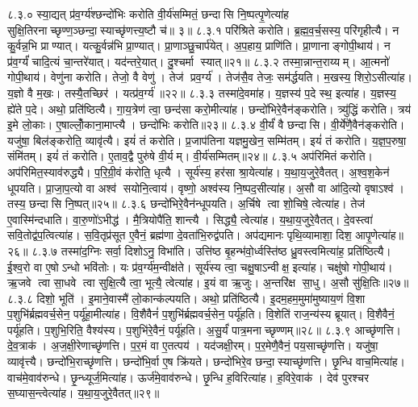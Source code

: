 ८.३.०
स्या॒द्यत् प्र॑व॒र्ग्य॑श्छन्दो॑भिः करोति वी॒र्य॑सम्मितं॒ छन्दासि नि॒ष्पत्पृ॒णेत्या॑ह सुक्षि॒तिरनाच्छृण्ण॒ञ्छन्दा॒स्याच्छृ॑णत्त्य॒ष्टौ च॑॥ ३॥
८.३.१
परि॑श्रिते करोति। ब्र॒ह्म॒व॒र्च॒सस्य॒ परि॑गृहीत्यै। न कु॒र्वन्न॒भि प्राण्यात्। यत्कु॒र्वन्न॑भि प्रा॒ण्यात्। प्रा॒णाञ्छु॒चार्प॑येत्। अ॒प॒हाय॒ प्राणि॑ति। प्रा॒णानाङ्गोपी॒थाय॑। न प्र॑व॒र्ग्यं॑ चादि॒त्यं चा॒न्तरे॑यात्। यद॑न्तरे॒यात्। दु॒श्चर्मा स्यात्॥२१॥
८.३.२
तस्मा॒न्नान्त॒राय्यम्। आ॒त्मनो॑ गोपी॒थाय॑। वेणु॑ना करोति। तेजो॒ वै वेणु॑। तेज॑ प्रव॒र्ग्य॑। तेज॑सै॒व तेजः॒ सम॑र्द्धयति। म॒खस्य॒ शिरो॒ऽसीत्या॑ह। य॒ज्ञो वै म॒खः। तस्यै॒तच्छिर॑। यत्प्र॑व॒र्ग्य॑॥२२॥
८.३.३
तस्मा॑दे॒वमा॑ह। य॒ज्ञस्य॑ प॒दे स्थ॒ इत्या॑ह। य॒ज्ञस्य॒ ह्ये॑ते प॒दे। अथो॒ प्रति॑ष्ठित्यै। गा॒य॒त्रेण॑ त्वा॒ छन्द॑सा करो॒मीत्या॑ह। छन्दो॑भिरे॒वैन॑ङ्करोति। त्र्यु॑द्धिं करोति। त्रय॑ इ॒मे लो॒काः। ए॒षाल्लोँ॒काना॒माप्त्यै। छन्दो॑भिः करोति॥२३॥
८.३.४
वी॒र्यं॑ वै छन्दासि। वी॒र्ये॑णै॒वैन॑ङ्करोति। यजु॑षा॒ बिल॑ङ्करोति॒ व्यावृ॑त्यै। इयं॑ तं करोति। प्र॒जाप॑तिना यज्ञमु॒खेन॒ सम्मि॑तम्। इयं॑ तं करोति। य॒ज्ञ॒प॒रुषा॒ संमि॑तम्। इयं॑ तं करोति। ए॒ताव॒द्वै पुरु॑षे वी॒र्यम्। वी॒र्य॑सम्मितम्॥२४॥
८.३.५
अप॑रिमितं करोति। अप॑रिमित॒स्याव॑रुद्ध्यै। प॒रि॒ग्री॒वं क॑रोति॒ धृत्यै। सूर्य॑स्य॒ हर॑सा श्रा॒येत्या॑ह। य॒था॒य॒जुरे॒वैतत्। अ॒श्व॒श॒केन॑ धूपयति। प्रा॒जा॒प॒त्यो वा अश्व॑ सयोनि॒त्वाय॑। वृष्णो॒ अश्व॑स्य नि॒ष्पद॒सीत्या॑ह। अ॒सौ वा आ॑दि॒त्यो वृषाऽश्व॑। तस्य॒ छन्दासि नि॒ष्पत्॥२५॥
८.३.६
छन्दो॑भिरे॒वैन॑न्धूपयति। अ॒र्चिषे त्वा शो॒चिषे॒ त्वेत्या॑ह। तेज॑ ए॒वास्मि॑न्दधाति। वा॒रु॒णो॑ऽभीद्ध॑। मै॒त्रियोपै॑ति॒ शान्त्यै। सिद्ध्यै॒ त्वेत्या॑ह। य॒था॒य॒जुरे॒वैतत्। दे॒वस्त्वा॑ सवि॒तोद्व॑प॒त्वित्या॑ह। स॒वि॒तृप्र॑सूत ए॒वैनं॒ ब्रह्म॑णा दे॒वता॑भि॒रुद्व॑पति। अप॑द्यमानः पृथि॒व्यामाशा॒ दिश॒ आपृ॒णेत्या॑ह॥२६॥
८.३.७
तस्मा॑द॒ग्निः सर्वा॒ दिशोऽनु॒ विभा॑ति। उत्ति॑ष्ठ बृ॒हन्भ॑वो॒र्ध्वस्ति॑ष्ठ ध्रु॒वस्त्वमित्या॑ह॒ प्रति॑ष्ठित्यै। ई॒श्व॒रो वा ए॒षोऽन्धो भवि॑तोः। यः प्र॑व॒र्ग्य॑म॒न्वीक्ष॑ते। सूर्य॑स्य त्वा॒ चक्षु॒षाऽन्वीक्ष॒ इत्या॑ह। चक्षु॑षो गोपी॒थाय॑। ऋ॒जवे त्वा सा॒धवे त्वा सुक्षि॒त्यै त्वा॒ भूत्यै॒ त्वेत्या॑ह। इ॒यं वा ऋ॒जुः। अ॒न्तरि॑क्ष सा॒धु। अ॒सौ सु॑क्षि॒तिः॥२७॥
८.३.८
दिशो॒ भूति॑। इ॒माने॒वास्मै॑ लो॒कान्क॑ल्पयति। अथो॒ प्रति॑ष्ठित्यै। इ॒दम॒हम॒मुमा॑मुष्याय॒णं  वि॒शा प॒शुभि॑र्ब्रह्मवर्च॒सेन॒ पर्यू॑हा॒मीत्या॑ह। वि॒शैवैनं॑ प॒शुभि॑र्ब्रह्मवर्च॒सेन॒ पर्यू॑हति। वि॒शेति॑ राज॒न्य॑स्य ब्रूयात्। वि॒शैवैनं॒ पर्यू॑हति। प॒शुभि॒रिति॒ वैश्य॑स्य। प॒शुभि॑रे॒वैनं॒ पर्यू॑हति। अ॒सु॒र्यं॑ पात्र॒मनाच्छृण्णम्॥२८॥
८.३.९
आच्छृ॑णत्ति। दे॒व॒त्राक॑। अ॒ज॒क्षी॒रेणाच्छृ॑णत्ति। प॒र॒मं वा ए॒तत्पय॑। यद॑जक्षी॒रम्। प॒र॒मेणै॒वैनं॒ पय॒साच्छृ॑णत्ति। यजु॑षा॒ व्यावृ॑त्त्यै। छन्दो॑भि॒राच्छृ॑णत्ति। छन्दो॑भि॒र्वा ए॒ष क्रि॑यते। छन्दो॑भिरे॒व छन्दा॒स्याच्छृ॑णत्ति। छृ॒न्धि वाच॒मित्या॑ह। वाच॑मे॒वाव॑रुन्धे। छृ॒न्ध्यूर्ज॒मित्या॑ह। ऊर्ज॑मे॒वाव॑रुन्धे। छृ॒न्धि ह॒विरित्या॑ह। ह॒विरे॒वाक॑। देव॑ पुरश्चर स॒घ्यास॒न्त्वेत्या॑ह। य॒था॒य॒जुरे॒वैतत्॥२९॥
\anuvakamend

